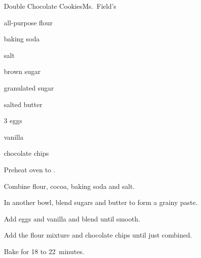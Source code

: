 \begin{recipe}{Double Chocolate Cookies}{Ms.~Field's}{}

\begin{ingredients}
\item \C{2\quarter} all-purpose flour
\item \C{\half} 
\item \tp{\half} baking soda
\item \tp{\quarter} salt
\item {} brown sugar
\item \C{\threequarter} granulated sugar
\item {} salted butter
\item 3 eggs
\item {} vanilla
\item {} chocolate chips
\end{ingredients}

\begin{directions}
\item Preheat oven to .
\item Combine flour, cocoa, baking soda and salt.
\item In  another bowl, blend sugars and butter to form a grainy paste.
\item Add eggs and vanilla and blend until smooth.
\item Add the flour mixture and chocolate chips until just combined.
\item Bake for 18 to 22~minutes.
\end{directions}
\end{recipe}
